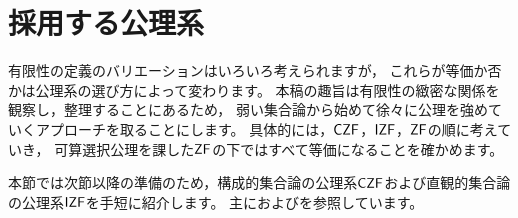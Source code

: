 \section{採用する公理系}
有限性の定義のバリエーションはいろいろ考えられますが，
これらが等価か否かは公理系の選び方によって変わります。
本稿の趣旨は有限性の緻密な関係を観察し，整理することにあるため，
弱い集合論から始めて徐々に公理を強めていくアプローチを取ることにします。
具体的には，\(\CZF\)，\(\IZF\)，\(\ZF\)の順に考えていき，
可算選択公理を課した\(\ZF\)の下ではすべて等価になることを確かめます。

本節では次節以降の準備のため，構成的集合論の公理系\(\CZF\)および直観的集合論の公理系\(\IZF\)を手短に紹介します。
主に\cite{sep:set_theory__constructive_an_intuitionistic_zf}および\cite{sep:axiom_of_czf_and_izf}を参照しています。